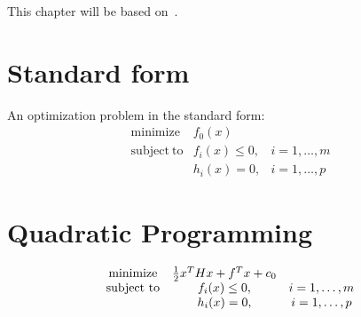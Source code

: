 This chapter will be based on~\citet{BoydVandenberghe2004}\cite{BoydVandenberghe2004}.

\section{Standard form}
An optimization problem in the standard form:
\begin{equation}
\begin{matrix}
\mathrm{minimize} &f_{0}(x)&\\
\mathrm{subject~ to} &f_{i}(x)\leq0, &i=1,\dots,m\\
&h_{i}(x)=0, &i=1,\dots,p
\end{matrix}
\end{equation}


\section{Quadratic Programming}
\begin{equation}
\begin{matrix}
\mathrm{minimize} &{1\over2}x^{T}Hx+f^{T}x+c_{0}&\\
\mathrm{subject~ to} &f_{i}(x)\leq0, &i=1,\dots,m\\
&h_{i}(x)=0, &i=1,\dots,p
\end{matrix}
\end{equation}


